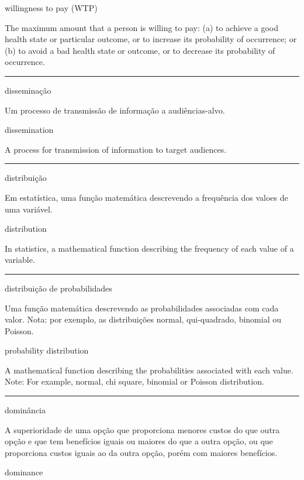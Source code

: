 \documentclass[
  openany]{book}
\begin{document}
willingness to pay (WTP)

The maximum amount that a person is willing to pay: (a) to achieve a good health state or particular outcome, or to increase its probability of occurrence; or (b) to avoid a bad health state or outcome, or to decrease its probability of occurrence.

\begin{center}\rule{0.5\linewidth}{0.5pt}\end{center}

disseminação

Um processo de transmissão de informação a audiências-alvo.

dissemination

A process for transmission of information to target audiences.

\begin{center}\rule{0.5\linewidth}{0.5pt}\end{center}

distribuição

Em estatística, uma função matemática descrevendo a frequência dos valoes de uma variável.

distribution

In statistics, a mathematical function describing the frequency of each value of a variable.

\begin{center}\rule{0.5\linewidth}{0.5pt}\end{center}

distribuição de probabilidades

Uma função matemática descrevendo as probabilidades associadas com cada valor. Nota: por exemplo, as distribuições normal, qui-quadrado, binomial ou Poisson.

probability distribution

A mathematical function describing the probabilities associated with each value. Note: For example, normal, chi square, binomial or Poisson distribution.

\begin{center}\rule{0.5\linewidth}{0.5pt}\end{center}

dominância

A superioridade de uma opção que proporciona menores custos do que outra opção e que tem benefícios iguais ou maiores do que a outra opção, ou que proporciona custos iguais ao da outra opção, porém com maiores benefícios.

dominance
\end{document}
